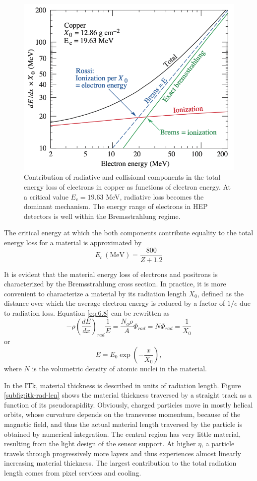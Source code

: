\begin{figure}[h!]
    \centering
    \includegraphics[width=0.65\linewidth]{figures/rad-vs-col.png}
    \caption{Contribution of radiative and collisional components in the total energy loss of electrons in copper as functions of electron energy. At a critical value $E_c=19.63$ MeV, radiative loss becomes the dominant mechanism. The energy range of electrons in HEP detectors is well within the Bremsstrahlung regime.}
    \label{fig:rad-vs-col}
\end{figure}
The critical energy at which the both components contribute equality to the total energy loss for a material is approximated by 
\begin{equation}
    \label{eq:6.10}
    E_c \,(\mathrm{MeV}) = \frac{800}{Z+1.2}
\end{equation}

It is evident that the material energy loss of electrons and positrons is characterized by the Bremsstrahlung cross section. 
In practice, it is more convenient to characterize a material by its radiation length $X_0$, defined as the distance over which the average electron energy is reduced by a factor of $1/e$ due to radiation loss. 
Equation \eqref{eq:6.8} can be rewritten as 
\begin{equation}
    \label{6.11}
    - \rho\left( \frac{dE}{dx}\right)_{rad} \frac{1}{E} = \frac{N_a\rho}{A} \Phi_{rad} = N\Phi_{rad} = \frac{1}{X_0}
\end{equation}
or 
\begin{equation}
    \label{eq:6.12}
    \boxed{E = E_0 \exp\left( -\frac{x}{X_0} \right)},
\end{equation}
where $N$ is the volumetric density of atomic nuclei in the material.

In the ITk, material thickness is described in units of radiation length. 
Figure \ref{subfig:itk-rad-len} shows the material thickness traversed by a straight track as a function of its pseudorapidity. 
Obviously, charged particles move in mostly helical orbits, whose curvature depends on the transverse momentum, because of the magnetic field, and thus the actual material length traversed by the particle is obtained by numerical integration. 
The central region has very little material, resulting from the light design of the sensor support. 
At higher $\eta$, a particle travels through progressively more layers and thus experiences almost linearly increasing material thickness. 
The largest contribution to the total radiation length comes from pixel services and cooling.


